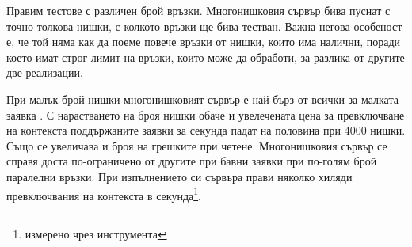 \begin{table}[h]
\end{table}

Правим тестове с различен брой връзки. Многонишковия сървър бива пуснат с точно толкова нишки, с колкото връзки ще бива тестван. Важна негова особеност е, че той няма как да поеме повече връзки от нишки, които има налични, поради което имат строг лимит на връзки, които може да обработи, за разлика от другите две реализации.

При малък брой нишки многонишковият сървър е най-бърз от всички за малката заявка \code{/}. С нарастването на броя нишки обаче и увелечената цена за превключване на контекста поддържаните заявки за секунда падат на половина при 4000 нишки. Също се увеличава и броя на грешките при четене. Многонишковия сървър се справя доста по-ограничено от другите при бавни заявки при по-голям брой паралелни връзки. При изпълнението си сървъра прави няколко хиляди превключвания на контекста в секунда\footnote{измерено чрез инструмента }.

